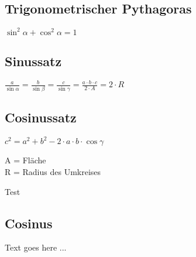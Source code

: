 \begin{sectionbox}

	\subsection{Trigonometrischer Pythagoras}
		\begin{emphbox}
			$ \sin ^2 \alpha + \cos ^2 \alpha = 1 $
		\end{emphbox}
		
	\subsection{Sinussatz}
		\begin{emphbox}
			$ \frac{a}{\sin \alpha} = \frac{b}{\sin \beta} = \frac{c}{\sin \gamma} = \frac{a \cdot b \cdot c}{2 \cdot A} = 2 \cdot R$
		\end{emphbox}

	\subsection{Cosinussatz}
		\begin{emphbox}
			$ c^2 = a^2 + b^2 - 2 \cdot a \cdot b \cdot \cos \gamma $
		\end{emphbox}

\begin{symbolbox}
	A = Fläche\\
	R = Radius des Umkreises
\end{symbolbox}

\begin{bluebox}
	Test
\end{bluebox}


\end{sectionbox}


\begin{sectionbox}
	\subsection{Cosinus}

	Text goes here ...


\end{sectionbox}


